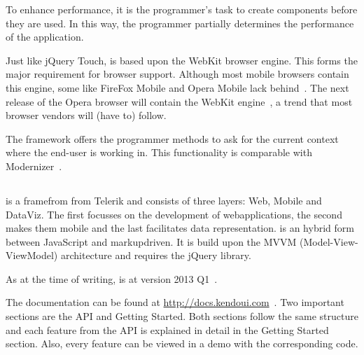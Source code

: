 \documentclass[a4paper]{artikel3}
\renewcommand{\url}[1]{\href{#1}{#1}}
\newcommand{\setspace}[0]{\vspace{2mm}}
\renewcommand{\paragraph}[1]{\setspace \noindent {\bf #1}  }
\begin{document}
To enhance performance,  it is the programmer's task to create components before they are used.  
In this way,  the programmer partially determines the performance of the application.

\paragraph{Browser support}
Just like jQuery Touch,  \sta{} is based upon the WebKit browser engine.  
This forms the major requirement for browser support.  
Although most mobile browsers contain this engine,  some like FireFox Mobile and Opera Mobile lack behind~\cite{JohnEClark2012}.  
The next release of the Opera browser will contain the WebKit engine~\cite{Wokke2013}, a trend that most browser vendors will (have to) follow.

The framework offers the programmer methods to ask for the current context where the end-user is working in.
This functionality is comparable with Modernizer~\cite{Modernizr2012}.  


\subsection{\kendo} %
\label{sec:frameworks-kendo}

\kendo{} is a framefrom from Telerik and consists of three layers:  \kendo{} Web,  \kendo{} Mobile and \kendo{} DataViz.
The first focusses on the development of webapplications,  the second makes them mobile and the last facilitates data representation.
\kendo{} is an hybrid form between JavaScript and markupdriven.
It is build upon the MVVM (Model-View-ViewModel) architecture and requires the jQuery library.

As at the time of writing,  \kendo{} is at version 2013 Q1~\cite{Telerik}. 

\paragraph{Documentation}
The documentation can be found at \url{http://docs.kendoui.com}~\cite{Telerikd}.
Two important sections are the API and Getting Started.
Both sections follow the same structure and each feature from the API is explained in detail in the Getting Started section.
Also,  every feature can be viewed in a demo with the corresponding code.
\end{document}

